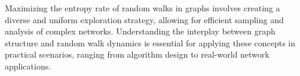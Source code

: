 
Maximizing the entropy rate of random walks in graphs involves creating a diverse and uniform exploration strategy, allowing for efficient sampling and analysis of complex networks. Understanding the interplay between graph structure and random walk dynamics is essential for applying these concepts in practical scenarios, ranging from algorithm design to real-world network applications.

